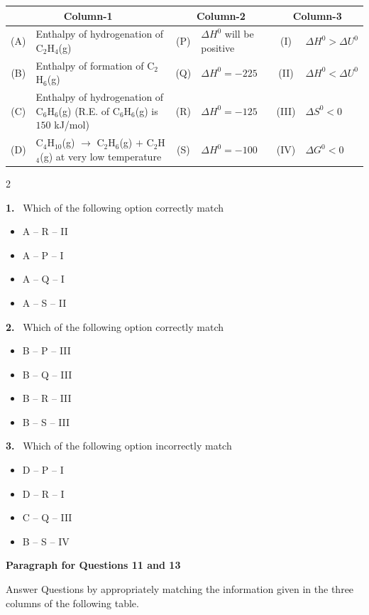 \documentclass[10pt]{extarticle}
\newcommand{\qn}[1]{\par\smallskip\noindent\textbf{#1.}~}
\newcommand{\paraq}[2]{\par\smallskip\noindent\textbf{Paragraph for Questions #1 and #2}\par}
\newenvironment{qoptions}{\begin{itemize}[leftmargin=1.8em,itemsep=1pt,topsep=2pt,label={}]}{\end{itemize}}
\newcommand{\opt}[2]{\item[(#1)] #2}
\begin{document}
\begin{center}\small\setlength{\tabcolsep}{4pt}
\begin{tabular}{|c|p{6cm}|c|p{3cm}|c|p{2.5cm}|}\hline
\multicolumn{2}{|c|}{Column-1} & \multicolumn{2}{c|}{Column-2} & \multicolumn{2}{c|}{Column-3}\\\hline
(A) & Enthalpy of hydrogenation of C$_2$H$_4$(g) & (P) & $\Delta H^0$ will be positive & (I) & $\Delta H^0>\Delta U^0$\\\hline
(B) & Enthalpy of formation of C$_2$H$_6$(g) & (Q) & $\Delta H^0=-225$ & (II) & $\Delta H^0<\Delta U^0$\\\hline
(C) & Enthalpy of hydrogenation of C$_6$H$_6$(g) (R.E. of C$_6$H$_6$(g) is $150$ kJ/mol) & (R) & $\Delta H^0=-125$ & (III) & $\Delta S^0<0$\\\hline
(D) & C$_4$H$_{10}$(g) $\to$ C$_2$H$_6$(g) $+$ C$_2$H$_4$(g) at very low temperature & (S) & $\Delta H^0=-100$ & (IV) & $\Delta G^0<0$\\\hline
\end{tabular}
\end{center}
\begin{multicols}{2}
\qn{1} Which of the following option correctly match
\begin{qoptions}
\opt{A}{A -- R -- II}
\opt{B}{A -- P -- I}
\opt{C}{A -- Q -- I}
\opt{D}{A -- S -- II}
\end{qoptions}
\qn{2} Which of the following option correctly match
\begin{qoptions}
\opt{A}{B -- P -- III}
\opt{B}{B -- Q -- III}
\opt{C}{B -- R -- III}
\opt{D}{B -- S -- III}
\end{qoptions}
\qn{3} Which of the following option incorrectly match
\begin{qoptions}
\opt{A}{D -- P -- I}
\opt{B}{D -- R -- I}
\opt{C}{C -- Q -- III}
\opt{D}{B -- S -- IV}
\end{qoptions}
\paraq{11}{13}
Answer Questions by appropriately matching the information given in the three columns of the following table.

\end{multicols}
\end{document}
